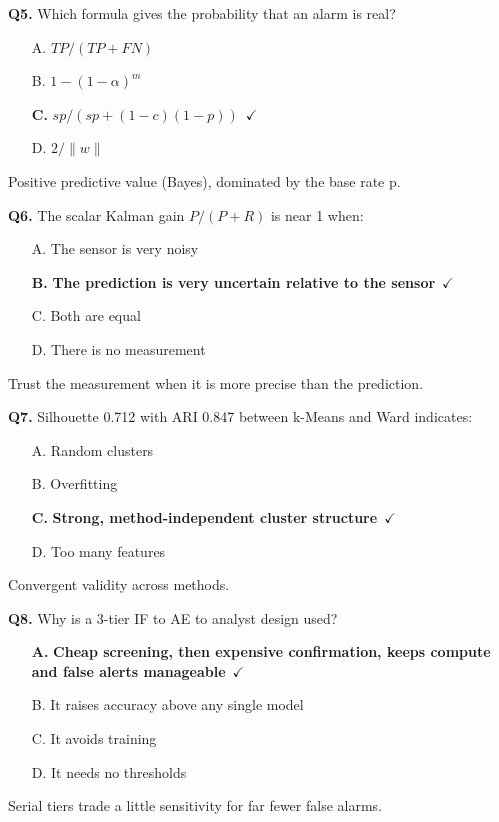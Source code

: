 \documentclass[11pt]{article}
\begin{document}
{\noindent\textbf{Q5.} Which formula gives the probability that an alarm is real?\begin{itemize}[leftmargin=2.2em,itemsep=0pt,topsep=1pt]\item[A.] $TP/(TP+FN)$\item[B.] $1-(1-\alpha)^m$\item[\textbf{C.}] \textbf{$sp/(sp+(1-c)(1-p))$}~{\color{GrnN}$\checkmark$}\item[D.] $2/\|w\|$\end{itemize} Positive predictive value (Bayes), dominated by the base rate p.\par\medskip

\noindent\textbf{Q6.} The scalar Kalman gain $P/(P+R)$ is near 1 when:\begin{itemize}[leftmargin=2.2em,itemsep=0pt,topsep=1pt]\item[A.] The sensor is very noisy\item[\textbf{B.}] \textbf{The prediction is very uncertain relative to the sensor}~{\color{GrnN}$\checkmark$}\item[C.] Both are equal\item[D.] There is no measurement\end{itemize} Trust the measurement when it is more precise than the prediction.\par\medskip

\noindent\textbf{Q7.} Silhouette 0.712 with ARI 0.847 between k-Means and Ward indicates:\begin{itemize}[leftmargin=2.2em,itemsep=0pt,topsep=1pt]\item[A.] Random clusters\item[B.] Overfitting\item[\textbf{C.}] \textbf{Strong, method-independent cluster structure}~{\color{GrnN}$\checkmark$}\item[D.] Too many features\end{itemize} Convergent validity across methods.\par\medskip

\noindent\textbf{Q8.} Why is a 3-tier IF to AE to analyst design used?\begin{itemize}[leftmargin=2.2em,itemsep=0pt,topsep=1pt]\item[\textbf{A.}] \textbf{Cheap screening, then expensive confirmation, keeps compute and false alerts manageable}~{\color{GrnN}$\checkmark$}\item[B.] It raises accuracy above any single model\item[C.] It avoids training\item[D.] It needs no thresholds\end{itemize} Serial tiers trade a little sensitivity for far fewer false alarms.\par\medskip

}
\end{document}
